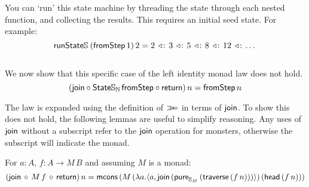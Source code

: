 You can `run' this state machine by threading the state through each nested function, and collecting the results. This requires an initial seed state. For example:
$$
\mathsf{run}\mathsf{State}\mathbb{S}_{}\,(\mathsf{fromStep}\, 1)\, 2 = 2\, \mathbin{\triangleleft\!:}\, 3\, \mathbin{\triangleleft\!:}\, 5\, \mathbin{\triangleleft\!:}\, 8\, \mathbin{\triangleleft\!:}\, 12\, \mathbin{\triangleleft\!:}\, \dots
$$\\
We now show that this specific case of the left identity monad law does not hold. 
$$
(\mathsf{join} \circ \mathsf{State}\mathbb{S}_{\mathbb{N}}\, \mathsf{fromStep} \circ \mathsf{return})\, n = \mathsf{fromStep}\, n
$$

The law is expanded using the definition of $\mathbin{\gg\!\!=}$ in terms of $\mathsf{join}$. 
To show this does not hold, the following lemmas are useful to simplify reasoning. Any uses of $\mathsf{join}$ without a subscript refer to the $\mathsf{join}$ operation for monsters, otherwise the subscript will indicate the monad.

\begin{lemma}\label{lemma:general_bind_law}
For $a : A$, $f : A \rightarrow M\, B$ and assuming $M$ is a monad:
$$
(\mathsf{join}\, \circ\,  M\, f\, \circ\, \mathsf{return})\, n = \mathsf{mcons}\, (M\,(\lambda a . \langle a, \mathsf{join}\, (\mathsf{pure}_{\mathbb{S}_{M}}\, (\mathsf{traverse}\, (f\, n))) \rangle)\, (\mathsf{head}\, (f\, n)))
$$
\end{lemma}

